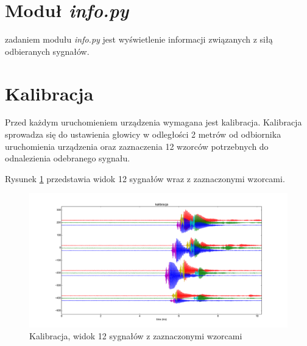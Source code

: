 \section{Moduł \textit{info.py}}

zadaniem modułu \textit{info.py} jest wyświetlenie informacji związanych z siłą odbieranych sygnałów.

\section{Kalibracja}

Przed każdym uruchomieniem urządzenia wymagana jest kalibracja.
Kalibracja sprowadza się do ustawienia głowicy w odległości 2 metrów od odbiornika
uruchomienia urządzenia oraz zaznaczenia 12 wzorców potrzebnych do odnalezienia 
odebranego sygnału.

Rysunek \ref{fig:kalibracja_12x} przedstawia widok 12 sygnałów wraz z zaznaczonymi wzorcami.


 \begin{figure}[h!]
    \centering
    \includegraphics[width=1.12\textwidth, trim= 46mm 0mm 0mm 0mm,clip]{kalibracja_12x}
    \caption{Kalibracja, widok 12 sygnałów z zaznaczonymi wzorcami}
    \label{fig:kalibracja_12x}
\end{figure}

